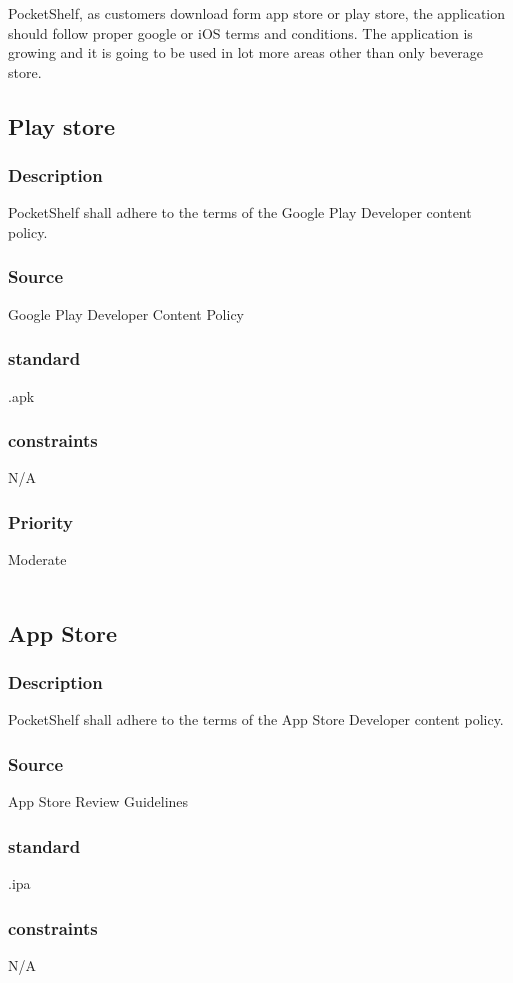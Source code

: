 PocketShelf, as customers download form app store or play store, the application should follow proper google or iOS terms and conditions. The application is growing and it is going to be used in lot more areas other than only beverage store.
\subsection{Play store}

\subsubsection{Description}
PocketShelf shall adhere to the terms of the Google Play Developer content policy.
\subsubsection{Source}
 Google Play Developer Content Policy 
 \subsubsection{standard}
 .apk
 \subsubsection{constraints}
 N/A
\subsubsection{Priority}
Moderate\\
\\

\subsection{App Store}
\subsubsection{Description}
PocketShelf shall adhere to the terms of the App Store Developer content policy.
\subsubsection{Source}
App Store Review Guidelines
\subsubsection{standard}
 .ipa
 \subsubsection{constraints}
 N/A
